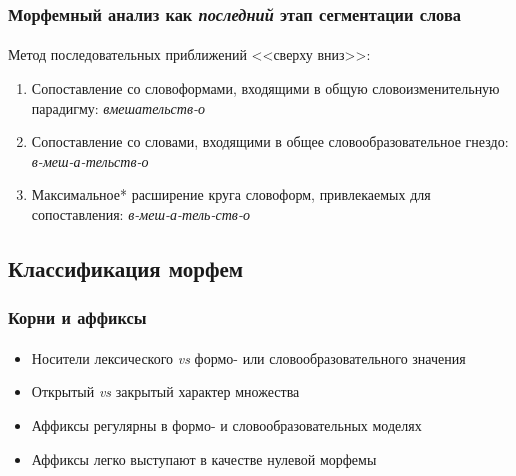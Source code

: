 \begin{frame}
    \frametitle{Морфемный анализ как \textit{последний} этап сегментации слова}
    \framesubtitle{\autocites{bogdanov:1997}[38]{plungyan:2003}}

    Метод последовательных приближений <<сверху вниз>>:
    \begin{enumerate}
        \item Сопоставление со словоформами, входящими в общую словоизменительную парадигму: \textit{вмешательств-о}~
        \item Сопоставление со словами, входящими в общее словообразовательное гнездо: \textit{в-меш-а-тельств-о}
        \item Максимальное* расширение круга словоформ, привлекаемых для сопоставления: \textit{в-меш-а-тель-ств-о}
    \end{enumerate}

    \vfill

\end{frame}

\subsection{Классификация морфем}


\begin{frame}
    \frametitle{Корни и аффиксы}
    \framesubtitle{\autocite[13--14]{zubova_menshikova:2014}}

    \begin{itemize}
        \item Носители лексического \textit{vs} формо- или словообразовательного значения
        \item Открытый \textit{vs} закрытый характер множества
        \item Аффиксы регулярны в формо- и словообразовательных моделях
        \item Аффиксы легко выступают в качестве нулевой морфемы
    \end{itemize}
\end{frame}

